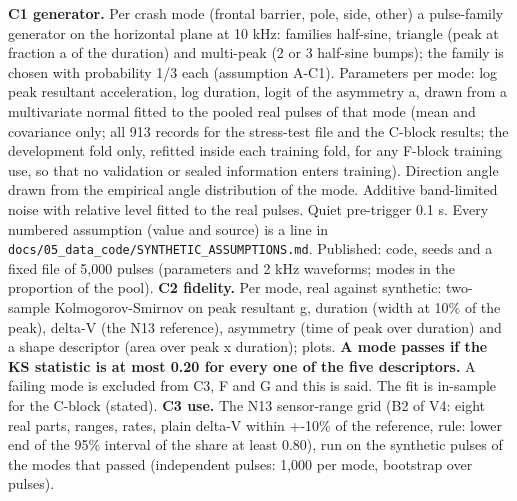 \textbf{C1 generator.} Per crash mode (frontal barrier, pole, side, other) a pulse-family generator on the horizontal plane at 10 kHz: families half-sine, triangle (peak at fraction a of the duration) and multi-peak (2 or 3 half-sine bumps); the family is chosen with probability 1/3 each (assumption A-C1). Parameters per mode: log peak resultant acceleration, log duration, logit of the asymmetry a, drawn from a multivariate normal fitted to the pooled real pulses of that mode (mean and covariance only; all 913 records for the stress-test file and the C-block results; the development fold only, refitted inside each training fold, for any F-block training use, so that no validation or sealed information enters training). Direction angle drawn from the empirical angle distribution of the mode. Additive band-limited noise with relative level fitted to the real pulses. Quiet pre-trigger 0.1 s. Every numbered assumption (value and source) is a line in \texttt{docs/05\_data\_code/SYNTHETIC\_ASSUMPTIONS.md}. Published: code, seeds and a fixed file of 5,000 pulses (parameters and 2 kHz waveforms; modes in the proportion of the pool).
\textbf{C2 fidelity.} Per mode, real against synthetic: two-sample Kolmogorov-Smirnov on peak resultant g, duration (width at 10\% of the peak), delta-V (the N13 reference), asymmetry (time of peak over duration) and a shape descriptor (area over peak x duration); plots. \textbf{A mode passes if the KS statistic is at most 0.20 for every one of the five descriptors.} A failing mode is excluded from C3, F and G and this is said. The fit is in-sample for the C-block (stated).
\textbf{C3 use.} The N13 sensor-range grid (B2 of V4: eight real parts, ranges, rates, plain delta-V within +-10\% of the reference, rule: lower end of the 95\% interval of the share at least 0.80), run on the synthetic pulses of the modes that passed (independent pulses: 1,000 per mode, bootstrap over pulses).
